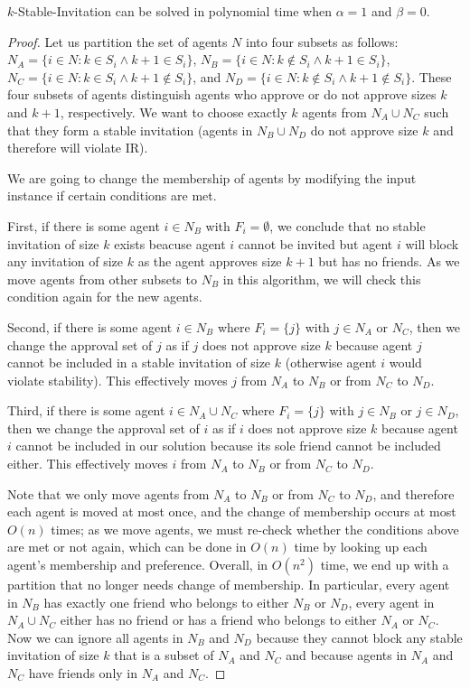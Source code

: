 \begin{theorem} \label{SIP:thm:easiness_stable_a1_b0}
	$k$-Stable-Invitation can be solved in polynomial time when $\alpha =1$ and $\beta = 0$.
\end{theorem} 
\begin{proof} %
Let us partition the set of agents $N$ into four subsets as follows:
$N_A = \{i \in N: k \in S_i \land k+1\in S_i\}$, 
$N_B = \{i \in N: k \not\in S_i \land k+1\in S_i\}$,
$N_C = \{i \in N: k \in S_i \land k+1 \not\in S_i\}$, and
$N_D = \{i \in N: k \not\in S_i \land k+1 \not\in S_i\}$. These four subsets of agents distinguish agents who approve or do not approve sizes $k$ and $k+1$, respectively. We want to choose exactly $k$ agents from $N_A \cup N_C$ such that they form a stable invitation (agents in $N_B \cup N_D$ do not approve size $k$ and therefore will violate IR).

We are going to change the membership of agents by modifying the input instance if certain conditions are met. 

First, if there is some agent $i\in N_B$ with $F_i = \emptyset$, we conclude that no stable invitation of size $k$ exists beacuse agent $i$ cannot be invited but agent $i$ will block any invitation of size $k$ as the agent approves size $k+1$ but has no friends. As we move agents from other subsets to $N_B$ in this algorithm, we will check this condition again for the new agents.

Second, if there is some agent $i\in N_B$ where $F_i = \{j\}$ with $j\in N_A$ or $N_C$, then we change the approval set of $j$ as if $j$ does not approve size $k$ because agent $j$ cannot be included in a stable invitation of size $k$ (otherwise agent $i$ would violate stability). This effectively moves $j$ from $N_A$ to $N_B$ or from $N_C$ to $N_D$.

Third, if there is some agent $i\in N_A \cup N_C$ where $F_i = \{j\}$ with $j\in N_B$ or $j\in N_D$, then we change the approval set of $i$ as if $i$ does not approve size $k$ because agent $i$ cannot be included in our solution because its sole friend cannot be included either. This effectively moves $i$ from $N_A$ to $N_B$ or from $N_C$ to $N_D$. 

Note that we only move agents from $N_A$ to $N_B$ or from $N_C$ to $N_D$, and therefore each agent is moved at most once, and the change of membership occurs at most $O(n)$ times; as we move agents, we must re-check whether the conditions above are met or not again, which can be done in $O(n)$ time by looking up each agent's membership and preference. Overall, in $O(n^2)$ time, we end up with a partition that no longer needs change of membership. In particular, every agent in $N_B$ has exactly one friend who belongs to either $N_B$ or $N_D$, every agent in $N_A \cup N_C$ either has no friend or has a friend who belongs to either $N_A$ or $N_C$. Now we can ignore all agents in $N_B$ and $N_D$ because they cannot block any stable invitation of size $k$ that is a subset of $N_A$ and $N_C$ and because agents in $N_A$ and $N_C$ have friends only in $N_A$ and $N_C$. 


\end{proof}
